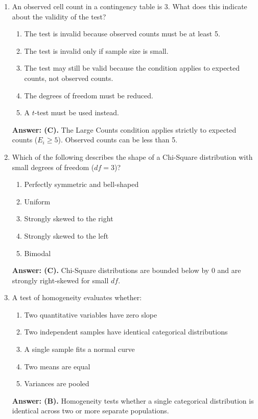 \begin{enumerate}[leftmargin=1.5em]
  \item An observed cell count in a contingency table is 3. What does this indicate about the validity of the test?
  \begin{enumerate}[label=(\Alph*)]
    \item The test is invalid because observed counts must be at least 5. \item The test is invalid only if sample size is small. \item The test may still be valid because the condition applies to expected counts, not observed counts. \item The degrees of freedom must be reduced. \item A $t$-test must be used instead.
  \end{enumerate}
  \textbf{Answer: (C).} The Large Counts condition applies strictly to expected counts ($E_i \ge 5$). Observed counts can be less than 5.

  \item Which of the following describes the shape of a Chi-Square distribution with small degrees of freedom ($df = 3$)?
  \begin{enumerate}[label=(\Alph*)]
    \item Perfectly symmetric and bell-shaped \item Uniform \item Strongly skewed to the right \item Strongly skewed to the left \item Bimodal
  \end{enumerate}
  \textbf{Answer: (C).} Chi-Square distributions are bounded below by 0 and are strongly right-skewed for small $df$.

  \item A test of homogeneity evaluates whether:
  \begin{enumerate}[label=(\Alph*)]
    \item Two quantitative variables have zero slope \item Two independent samples have identical categorical distributions \item A single sample fits a normal curve \item Two means are equal \item Variances are pooled
  \end{enumerate}
  \textbf{Answer: (B).} Homogeneity tests whether a single categorical distribution is identical across two or more separate populations.


\end{enumerate}
